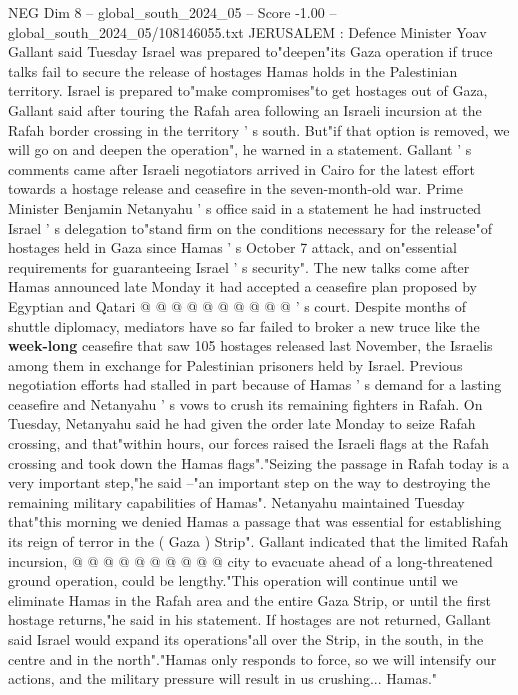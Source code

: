 \begin{textsample}{NEG Dim 8 – global\_south\_2024\_05 – Score -1.00 – global\_south\_2024\_05/108146055.txt}  \label{ex:f8_neg_107}
JERUSALEM : Defence Minister Yoav Gallant said Tuesday Israel was prepared to"deepen"its Gaza operation if truce talks fail to secure the release of hostages Hamas holds in the Palestinian territory.
Israel is prepared to"make compromises"to get hostages out of Gaza, Gallant said after touring the Rafah area following an Israeli incursion at the Rafah border crossing in the territory ' s south.
But"if that option is removed, we will go on and deepen the operation", he warned in a statement.
Gallant ' s comments came after Israeli negotiators arrived in Cairo for the latest effort towards a hostage release and ceasefire in the seven-month-old war.
Prime Minister Benjamin Netanyahu ' s office said in a statement he had instructed Israel ' s delegation to"stand firm on the conditions necessary for the release"of hostages held in Gaza since Hamas ' s October 7 attack, and on"essential requirements for guaranteeing Israel ' s security".
The new talks come after Hamas announced late Monday it had accepted a ceasefire plan proposed by Egyptian and Qatari @ @ @ @ @ @ @ @ @ @ ' s court.
Despite months of shuttle diplomacy, mediators have so far failed to broker a new truce like the \textbf{week-long} ceasefire that saw 105 hostages released last November, the Israelis among them in exchange for Palestinian prisoners held by Israel.
Previous negotiation efforts had stalled in part because of Hamas ' s demand for a lasting ceasefire and Netanyahu ' s vows to crush its remaining fighters in Rafah.
On Tuesday, Netanyahu said he had given the order late Monday to seize Rafah crossing, and that"within hours, our forces raised the Israeli flags at the Rafah crossing and took down the Hamas flags"."Seizing the passage in Rafah today is a very important step,"he said --"an important step on the way to destroying the remaining military capabilities of Hamas".
Netanyahu maintained Tuesday that"this morning we denied Hamas a passage that was essential for establishing its reign of terror in the ( Gaza ) Strip".
Gallant indicated that the limited Rafah incursion, @ @ @ @ @ @ @ @ @ @ city to evacuate ahead of a long-threatened ground operation, could be lengthy."This operation will continue until we eliminate Hamas in the Rafah area and the entire Gaza Strip, or until the first hostage returns,"he said in his statement.
If hostages are not returned, Gallant said Israel would expand its operations"all over the Strip, in the south, in the centre and in the north"."Hamas only responds to force, so we will intensify our actions, and the military pressure will result in us crushing...
Hamas."

\end{textsample}
